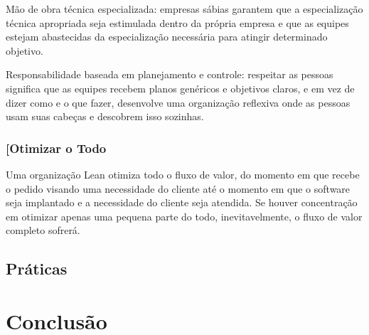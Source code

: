 Mão de obra técnica especializada: empresas sábias garantem que a especialização técnica apropriada seja estimulada dentro da própria empresa e que as equipes estejam abastecidas da especialização necessária para atingir determinado objetivo.

Responsabilidade baseada em planejamento e controle: respeitar as pessoas significa que as equipes recebem planos genéricos e objetivos claros, e em vez de dizer como e o que fazer, desenvolve uma organização reflexiva onde as pessoas usam suas cabeças e descobrem isso sozinhas.

\subsubsection[Otimizar o Todo]{[Otimizar o Todo}

Uma organização Lean otimiza todo o fluxo de valor, do momento em que recebe o pedido visando uma necessidade do cliente até o momento em que o software seja implantado e a necessidade do cliente seja atendida. Se houver concentração em otimizar apenas uma pequena parte do todo, inevitavelmente, o fluxo de valor completo sofrerá. 

\subsection[ Práticas]{ Práticas}

\section[Conclusão]{Conclusão}
